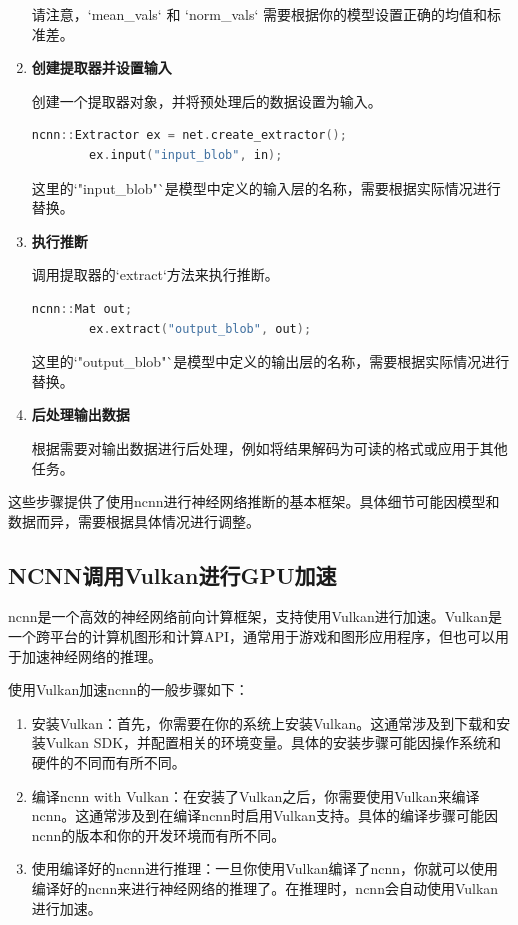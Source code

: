 \begin{enumerate}
	请注意，`mean\_vals` 和 `norm\_vals` 需要根据你的模型设置正确的均值和标准差。

	\item \textbf{创建提取器并设置输入}

	创建一个提取器对象，并将预处理后的数据设置为输入。

	\begin{lstlisting}[caption={设置输入输出},language=C++]
		ncnn::Extractor ex = net.create_extractor();
		ex.input("input_blob", in);
	\end{lstlisting}

	这里的`"input\_blob"`是模型中定义的输入层的名称，需要根据实际情况进行替换。

	\item \textbf{执行推断}

	调用提取器的`extract`方法来执行推断。

	\begin{lstlisting}[caption={推理},language=C++]
		ncnn::Mat out;
		ex.extract("output_blob", out);
	\end{lstlisting}

	这里的`"output\_blob"`是模型中定义的输出层的名称，需要根据实际情况进行替换。

	\item \textbf{后处理输出数据}

	根据需要对输出数据进行后处理，例如将结果解码为可读的格式或应用于其他任务。

\end{enumerate}

这些步骤提供了使用ncnn进行神经网络推断的基本框架。具体细节可能因模型和数据而异，需要根据具体情况进行调整。

\subsection{NCNN调用Vulkan进行GPU加速}

ncnn是一个高效的神经网络前向计算框架，支持使用Vulkan进行加速。Vulkan是一个跨平台的计算机图形和计算API，通常用于游戏和图形应用程序，但也可以用于加速神经网络的推理。

使用Vulkan加速ncnn的一般步骤如下：

\begin{enumerate}
	\item 安装Vulkan：首先，你需要在你的系统上安装Vulkan。这通常涉及到下载和安装Vulkan SDK，并配置相关的环境变量。具体的安装步骤可能因操作系统和硬件的不同而有所不同。
	\item 编译ncnn with Vulkan：在安装了Vulkan之后，你需要使用Vulkan来编译ncnn。这通常涉及到在编译ncnn时启用Vulkan支持。具体的编译步骤可能因ncnn的版本和你的开发环境而有所不同。
	\item 使用编译好的ncnn进行推理：一旦你使用Vulkan编译了ncnn，你就可以使用编译好的ncnn来进行神经网络的推理了。在推理时，ncnn会自动使用Vulkan进行加速。
\end{enumerate}

